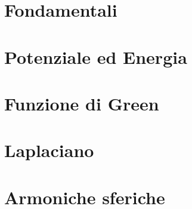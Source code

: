 \documentclass{article}
\begin{document}
\section{Fondamentali}


\section{Potenziale ed Energia}


\section{Funzione di Green}



\section{Laplaciano}


\section{Armoniche sferiche}

\end{document}
